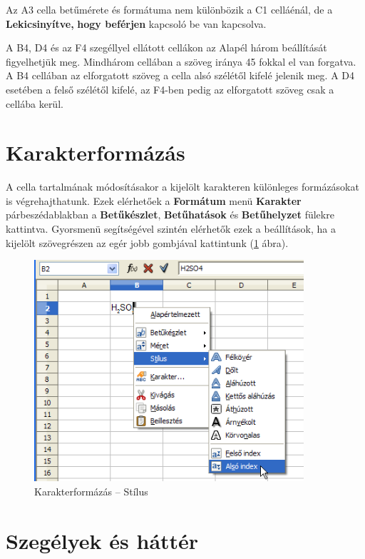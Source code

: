 Az A3 cella betűmérete és formátuma nem különbözik a C1
celláénál, de a \textbf{Lekicsinyítve, }\textbf{hogy
beférjen} kapcsoló be van kapcsolva.

A B4, D4 és az F4 szegéllyel ellátott cellákon az Alapél
három beállítását figyelhetjük meg. Mindhárom cellában
a szöveg iránya 45 fokkal el van forgatva. A B4 cellában az
elforgatott szöveg a cella alsó szélétől kifelé jelenik
meg. A D4 esetében a felső szélétől kifelé, az F4-ben
pedig az elforgatott szöveg csak a cellába kerül.


\section{Karakterformázás}

A cella tartalmának módosításakor a kijelölt karakteren
különleges formázásokat is végrehajthatunk. Ezek
elérhetőek a \textbf{Formátum} menü \textbf{Karakter}
párbeszédablakban a  \textbf{Betűkészlet},
\textbf{Betűhatások} és \textbf{Betűhelyzet} fülekre
kattintva. Gyorsmenü segítségével szintén elérhetők
ezek a beállítások, ha a kijelölt szövegrészen az egér
jobb gombjával kattintunk (\ref{KarakterStílus} ábra).

\begin{figure}[!h]
\begin{center}
\includegraphics[width=10.005cm]{oocalcv2-img14.png}
\caption{Karakterformázás --  Stílus}\label{KarakterStílus}
\end{center}
\end{figure}

\section{Szegélyek és háttér}

